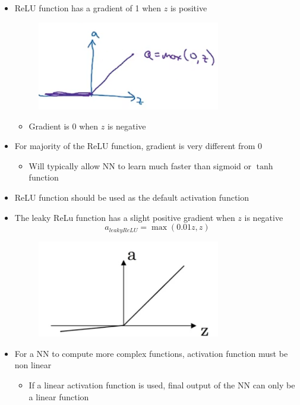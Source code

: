 \documentclass[12pt, letterpaper]{article}
\begin{document}
\begin{itemize}
        \item ReLU function has a gradient of 1 when $z$ is positive
        \begin{figure}[ht]
            \centering
            \includegraphics[width=8cm]{9.png}
        \end{figure}
        \begin{itemize}
            \item Gradient is 0 when $z$ is negative
        \end{itemize}
        \item For majority of the ReLU function, gradient is very different from 0
        \begin{itemize}
            \item Will typically allow NN to learn much faster than sigmoid or $\tanh$ function
        \end{itemize}
        \item ReLU function should be used as the default activation function
        \item The leaky ReLu function has a slight positive gradient when $z$ is negative
        $$a_{leaky ReLU}=\max(0.01z, z)$$
        \begin{figure}[ht]
            \centering
            \includegraphics[width=8cm]{10.png}
        \end{figure}
        \item For a NN to compute more complex functions, activation function must be non linear
        \begin{itemize}
            \item If a linear activation function is used, final output of the NN can only be a linear function 

\end{itemize}
\end{itemize}
\end{document}
